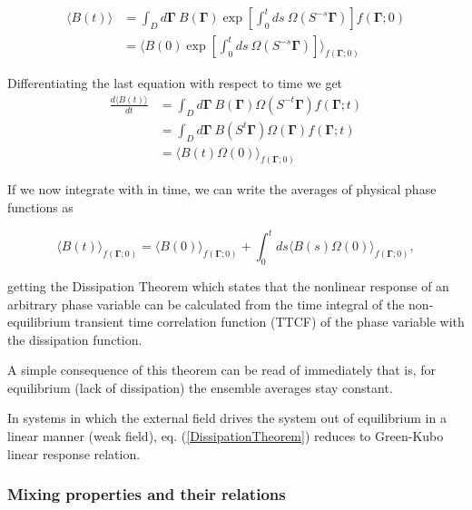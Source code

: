 \documentclass[a4paper,12pt,nofootinbib]{article}
\begin{document}
\begin{equation}
\begin{aligned}
	  \langle B(t) \rangle &= \int_D d\bm{\Gamma}\ B(\bm{\Gamma})\exp[\int_0^{t} ds\ \Omega(S^{-s}\bm{\Gamma})]f(\bm{\Gamma};0)\\
	  &= \langle B(0) \exp[\int_0^{t} ds\ \Omega(S^{-s}\bm{\Gamma})] \rangle_{f(\bm{\Gamma};0)}
\end{aligned}
\end{equation}

Differentiating the last equation with respect to time we get
\begin{equation}
\begin{aligned}
 \frac{d\langle B(t) \rangle}{dt}
 &= \int_D d\bm{\Gamma}\ B(\bm{\Gamma}) \Omega(S^{-t}\bm{\Gamma}) f(\bm{\Gamma};t)\\
&= \int_D d\bm{\Gamma}\ B(S^t \bm{\Gamma}) \Omega(\bm{\Gamma})f(\bm{\Gamma};t)\\
&= \langle B(t)\Omega(0) \rangle_{f(\bm{\Gamma};0)}
\end{aligned}
\end{equation}

If we now integrate with in time, we can write the averages of physical phase functions as

\begin{equation}
\langle B(t)\rangle_{f(\bm{\Gamma};0)} =\langle B(0) \rangle_{f(\bm{\Gamma};0)} +\int_0^t ds \langle B(s) \Omega(0) \rangle_{f(\bm{\Gamma};0)}, \label{DissipationTheorem}
\end{equation}

getting the Dissipation Theorem which states that the nonlinear response of an arbitrary phase variable can be calculated from the time integral of the non-equilibrium transient time correlation function (TTCF) of the phase variable with the dissipation function.




A simple consequence of this theorem can be read of immediately that is, for equilibrium (lack of dissipation) the ensemble averages stay constant.

In systems in which the external field drives the system out of equilibrium in a linear manner (weak field), eq. (\ref{DissipationTheorem}) reduces to Green-Kubo linear response relation.

\subsubsection{Mixing properties and their relations}
\end{document}
